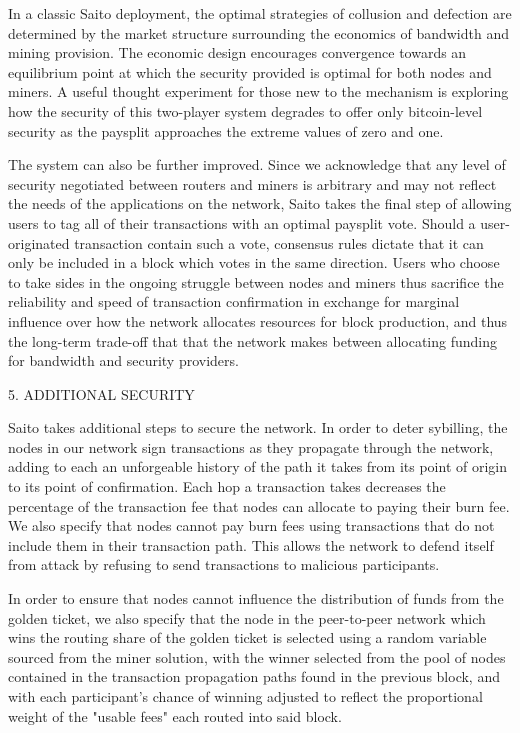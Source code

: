 \documentclass[11.5pt, oneside]{article}   	%
\begin{document}
\begin{multicols}{2}
In a classic Saito deployment, the optimal strategies of collusion and defection are determined by the market structure surrounding the economics of bandwidth and mining provision. The economic design encourages convergence towards an equilibrium point at which the security provided is optimal for both nodes and miners. A useful thought experiment for those new to the mechanism is exploring how the security of this two-player system degrades to offer only bitcoin-level security as the paysplit approaches the extreme values of zero and one.

The system can also be further improved. Since we acknowledge that any level of security negotiated between routers and miners is arbitrary and may not reflect the needs of the applications on the network, Saito takes the final step of allowing users to tag all of their transactions with an optimal paysplit vote. Should a user-originated transaction contain such a vote, consensus rules dictate that it can only be included in a block which votes in the same direction. Users who choose to take sides in the ongoing struggle between nodes and miners thus sacrifice the reliability and speed of transaction confirmation in exchange for marginal influence over how the network allocates resources for block production, and thus the long-term trade-off that that the network makes between allocating funding for bandwidth and security providers.


5. ADDITIONAL SECURITY

Saito takes additional steps to secure the network. In order to deter sybilling, the nodes in our network sign transactions as they propagate through the network, adding to each an unforgeable history of the path it takes from its point of origin to its point of confirmation. Each hop a transaction takes decreases the percentage of the transaction fee that nodes can allocate to paying their burn fee. We also specify that nodes cannot pay burn fees using transactions that do not include them in their transaction path. This allows the network to defend itself from attack by refusing to send transactions to malicious participants.

In order to ensure that nodes cannot influence the distribution of funds from the golden ticket, we also specify that the node in the peer-to-peer network which wins the routing share of the golden ticket is selected using a random variable sourced from the miner solution, with the winner selected from the pool of nodes contained in the transaction propagation paths found in the previous block, and with each participant's chance of winning adjusted to reflect the proportional weight of the "usable fees" each routed into said block.


\end{multicols}
\end{document}
